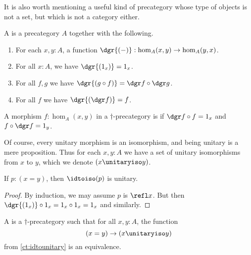 It is also worth mentioning a useful kind of precategory whose type of objects is not a set, but which is not a category either.

\begin{defn}\label{ct:dagger-precategory}
  A 
  is a precategory $A$ together with the following.
  \begin{enumerate}
  \item For each $x,y:A$, a function $\dgr{(-)}:\hom_A(x,y) \to \hom_A(y,x)$.
  \item For all $x:A$, we have $\dgr{(1_x)} = 1_x$.
  \item For all $f,g$ we have $\dgr{(g\circ f)} = \dgr f \circ \dgr g$.
  \item For all $f$ we have $\dgr{(\dgr f)} = f$.
  \end{enumerate}
\end{defn}

\begin{defn}\label{ct:unitary}
  A morphism $f:\hom_A(x,y)$ in a $\dagger$-precategory is 
  if $\dgr f \circ f = 1_x$ and $f\circ \dgr f = 1_y$.
\end{defn}

Of course, every unitary morphism is an isomorphism, and being unitary is a mere proposition.
Thus for each $x,y:A$ we have a set of unitary isomorphisms from $x$ to $y$, which we denote $(x\unitaryiso y)$.

\begin{lem}\label{ct:idtounitary}
  If $p:(x=y)$, then $\idtoiso(p)$ is unitary.
\end{lem}
\begin{proof}
  By induction, we may assume $p$ is $\refl x$.
  But then $\dgr{(1_x)} \circ 1_x = 1_x\circ 1_x = 1_x$ and similarly.
\end{proof}

\begin{defn}\label{ct:dagger-category}
  A 
  is a $\dagger$-precategory such that for all $x,y:A$, the function
  \[ (x=y) \to (x \unitaryiso y) \]
  from \cref{ct:idtounitary} is an equivalence.
\end{defn}

